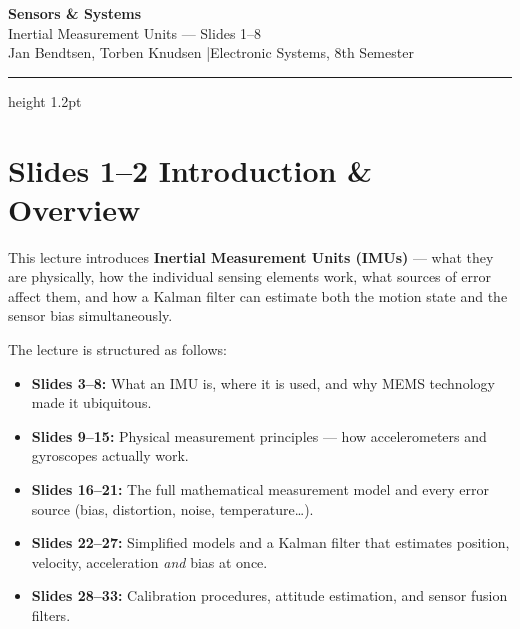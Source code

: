 \documentclass[12pt, a4paper]{article}
\begin{document}
\listoftodos
\clearpage

\begin{center}
  {\LARGE\bfseries\color{headernavy} Sensors \& Systems}\\[4pt]
  {\large Inertial Measurement Units --- Slides 1--8}\\[2pt]
  {\normalsize Jan Bendtsen, Torben Knudsen \quad|\quad Electronic Systems, 8th Semester}
\end{center}

\vspace{4pt}
\hrule height 1.2pt
\vspace{12pt}

\section*{Slides 1--2 \quad Introduction \& Overview}

This lecture introduces \textbf{Inertial Measurement Units (IMUs)} ---
what they are physically, how the individual sensing elements work,
what sources of error affect them, and how a Kalman filter can estimate
both the motion state and the sensor bias simultaneously.

The lecture is structured as follows:

\begin{itemize}[leftmargin=1.4em]
  \item \textbf{Slides 3--8:} What an IMU is, where it is used, and why
        MEMS technology made it ubiquitous.
  \item \textbf{Slides 9--15:} Physical measurement principles ---
        how accelerometers and gyroscopes actually work.
  \item \textbf{Slides 16--21:} The full mathematical measurement model
        and every error source (bias, distortion, noise, temperature\ldots).
  \item \textbf{Slides 22--27:} Simplified models and a Kalman filter that
        estimates position, velocity, acceleration \emph{and} bias at once.
  \item \textbf{Slides 28--33:} Calibration procedures, attitude estimation,
        and sensor fusion filters.
\end{itemize}
\end{document}

